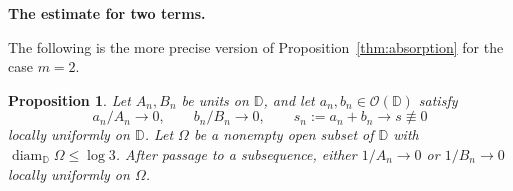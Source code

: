 \documentclass[12pt,letterpaper,reqno]{amsart}
\newtheorem{prop}[thm]{Proposition}
\theoremstyle{definition}
\numberwithin{equation}{section}
\newcommand{\D}{\mathbb D}
\newcommand{\OO}{\mathcal O}
\begin{document}
	\medskip\noindent\textbf{The estimate for two terms.}
	
	The following is the more precise version of
	Proposition~\ref{thm:absorption} for the case $m=2$.
	
	\begin{prop}\label{prop:sharp-two-absorption}
		Let $A_n,B_n$ be units on $\D$, and let $a_n,b_n\in\OO(\D)$ satisfy
		\begin{equation*}
			a_n/A_n\longrightarrow0,\qquad
			b_n/B_n\longrightarrow0,\qquad
			s_n:=a_n+b_n\longrightarrow s\not\equiv0
		\end{equation*}
		locally uniformly on $\D$. Let $\Omega$ be a nonempty open subset
		of $\D$ with $\operatorname{diam}_{\D}\Omega\le\log3$.
		After passage to a subsequence, either $1/A_n\to0$ or $1/B_n\to0$
		locally uniformly on $\Omega$.
	\end{prop}
	
\end{document}
